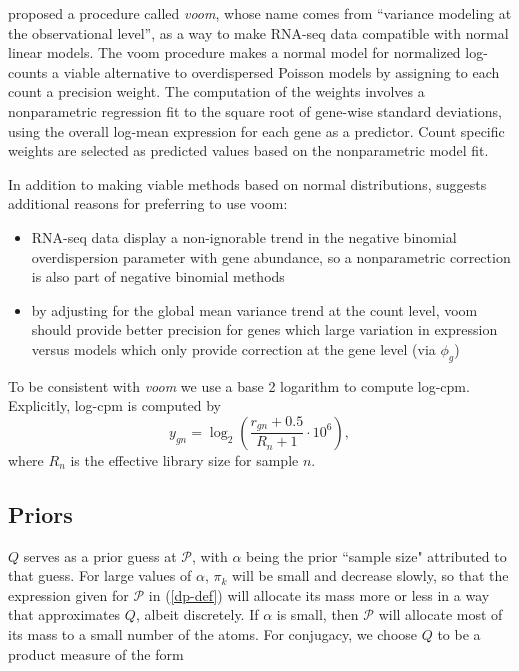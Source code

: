 
\cite{voom} proposed a procedure called \textit{voom}, whose name comes from ``variance modeling at the observational level'', as a way to make RNA-seq data compatible with normal linear models. The voom procedure makes a normal model for normalized log-counts a viable alternative to overdispersed Poisson models by assigning to each count a precision weight. The computation of the weights involves a nonparametric regression fit to the square root of gene-wise standard deviations, using the overall log-mean expression for each gene as a predictor. Count specific weights are selected as predicted values based on the nonparametric model fit.

In addition to making viable methods based on normal distributions, \citet{voom} suggests additional reasons for preferring to use voom:
\begin{itemize}
\item RNA-seq data display a non-ignorable trend in the negative binomial overdispersion parameter with gene abundance, so a nonparametric correction is also part of negative binomial methods
\item by adjusting for the global mean variance trend at the count level, voom should provide better precision for genes which large variation in expression versus models which only provide correction at the gene level (via $\phi_g$)
\end{itemize}

To be consistent with \textit{voom} we use a base 2 logarithm to compute log-cpm. Explicitly, log-cpm is computed by
\[y_{gn} = \log_2\left( \frac{r_{gn}+0.5}{R_n + 1}\cdot 10^6 \right),\]
where $R_n$ is the effective library size for sample $n$.


\subsection{Priors}
$Q$ serves as a prior guess at $\mathcal{P}$, with $\alpha$ being the prior ``sample size" attributed to that guess. For large values of $\alpha$, $\pi_k$ will be small and decrease slowly, so that the expression given for $\mathcal{P}$ in (\ref{dp-def}) will allocate its mass more or less in a way that approximates $Q$, albeit discretely. If $\alpha$ is small, then $\mathcal{P}$ will allocate most of its mass to a small number of the atoms. For conjugacy, we choose $Q$ to be a product measure of the form


